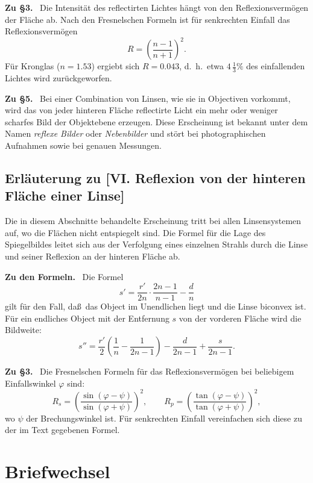\documentclass[12pt,a4paper]{article}
\theoremstyle{plain}
\theoremstyle{definition}
\theoremstyle{remark}
\begin{document}
\textbf{Zu \S 3.} \ Die Intensit\"at des reflectirten Lichtes h\"angt
von den Reflexionsverm\"ogen der Fl\"ache ab. Nach den
{Fresnel}schen Formeln ist f\"ur senkrechten Einfall das
Reflexionsverm\"ogen
\[
R = \left(\frac{n-1}{n+1}\right)^{2}.
\]
F\"ur Kronglas ($n = 1.53$) ergiebt sich $R = 0.043$, d.~h.~etwa
$4\,\frac{1}{3}\%$ des einfallenden Lichtes wird zur\"uckgeworfen.

\textbf{Zu \S 5.} \ Bei einer Combination von Linsen, wie sie in
Objectiven vorkommt, wird das von jeder hinteren Fl\"ache
reflectirte Licht ein mehr oder weniger scharfes Bild der
Objektebene erzeugen. Diese Erscheinung ist bekannt unter dem Namen
\textit{reflexe Bilder} oder \textit{Nebenbilder} und st\"ort bei
photographischen Aufnahmen sowie bei genauen Messungen.


\subsection*{Erl\"auterung zu [VI. Reflexion von der hinteren Fl\"ache einer Linse]}

Die in diesem Abschnitte behandelte Erscheinung tritt bei allen
Linsensystemen auf, wo die Fl\"achen nicht entspiegelt sind. Die
Formel f\"ur die Lage des Spiegelbildes leitet sich aus der
Verfolgung eines einzelnen Strahls durch die Linse und seiner
Reflexion an der hinteren Fl\"ache ab.

\textbf{Zu den Formeln.} \ Die Formel
\[
s' = \frac{r'}{2n}\cdot\frac{2n-1}{n-1} - \frac{d}{n}
\]
gilt f\"ur den Fall, da\ss\ das Object im Unendlichen liegt und die
Linse biconvex ist. F\"ur ein endliches Object mit der Entfernung
$s$ von der vorderen Fl\"ache wird die Bildweite:
\[
s'' = \frac{r'}{2}\left(\frac{1}{n} - \frac{1}{2n-1}\right)
- \frac{d}{2n-1} + \frac{s}{2n-1}.
\]

\textbf{Zu \S 3.} \ Die {\sc Fresnel}schen Formeln f\"ur das
Reflexionsverm\"ogen bei beliebigem Einfallswinkel $\varphi$ sind:
\[
R_{s} = \left(\frac{\sin(\varphi-\psi)}{\sin(\varphi+\psi)}\right)^{2},\qquad
R_{p} = \left(\frac{\tan(\varphi-\psi)}{\tan(\varphi+\psi)}\right)^{2},
\]
wo $\psi$ der Brechungswinkel ist. F\"ur senkrechten Einfall
vereinfachen sich diese zu der im Text gegebenen Formel.


\newpage
\section*{Briefwechsel}
\end{document}
